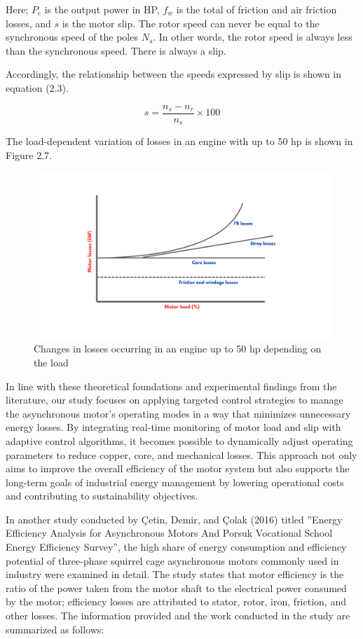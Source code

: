 Here; $P_c$ is the output power in HP, $f_w$ is the total of friction 
and air friction losses, and $s$ is the motor slip. The rotor speed 
can never be equal to the synchronous speed of the poles $N_s$. 
In other words, the rotor speed is always less than the synchronous speed. 
There is always a slip.

Accordingly, the relationship between the speeds expressed by slip is shown in equation (2.3).

\begin{equation}
s = \frac{n_s - n_r}{n_s} \times 100
\end{equation}

The load-dependent variation of losses in an engine with up to 50 hp is shown in Figure 2.7.

\begin{figure}[H]
    \centering
    \includegraphics[width=0.8\columnwidth]{imgs/Motor losses (kW) (5).png}
    \caption[Short description for list of figures]{Changes in losses occurring in an engine up to 50 hp depending on the load }
    \label{fig-magnitude}
    \end{figure}%

In line with these theoretical foundations and experimental findings from the literature, our study focuses on applying targeted control strategies to manage the asynchronous motor’s operating modes in a way that minimizes unnecessary energy losses. By integrating real-time monitoring of motor load and slip with adaptive control algorithms, it becomes possible to dynamically adjust operating parameters to reduce copper, core, and mechanical losses. This approach not only aims to improve the overall efficiency of the motor system but also supports the long-term goals of industrial energy management by lowering operational costs and contributing to sustainability objectives.


In another study conducted by Çetin, Demir, and Çolak (2016) titled ''Energy Efficiency Analysis for Asynchronous Motors And Porsuk Vocational School Energy Efficiency Survey'', the high share of energy consumption and efficiency potential of three-phase squirrel cage asynchronous motors commonly used in industry were examined in detail. The study states that motor efficiency is the ratio of the power taken from the motor shaft to the electrical power consumed by the motor; efficiency losses are attributed to stator, rotor, iron, friction, and other losses. The information provided and the work conducted in the study are summarized as follows:

